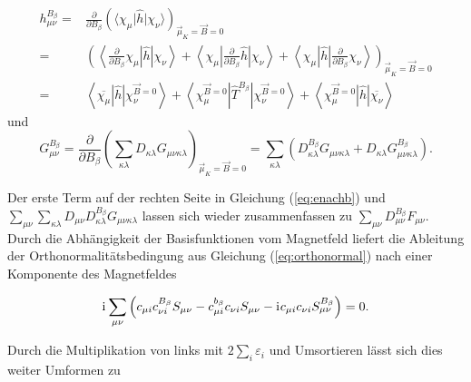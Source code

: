   	     \begin{equation}
     \begin{aligned}
       h_{\mu\nu}^{B_\beta}=&\frac{\partial}{\partial B_\beta}\left(\langle\chi_\mu\vert\hat{h}\vert\chi_\nu\rangle\right)_{\vec{\mu}_K=\vec{B}=0}\\
       =&\left(\left\langle\frac{\partial}{\partial B_\beta}\chi_\mu\left\vert\hat{h}\right\vert\chi_\nu\right\rangle
        +\left\langle\chi_\mu\left\vert\frac{\partial}{\partial B_\beta}\hat{h}\right\vert\chi_\nu\right\rangle
        +\left\langle\chi_\mu\left\vert\hat{h}\right\vert\frac{\partial}{\partial B_\beta}\chi_\nu\right\rangle\right)_{\vec{\mu}_K=\vec{B}=0}\\
       =&\left\langle\overline{\chi_\mu}\left\vert\hat{h}\right\vert\chi_\nu^{\vec{B}=0}\right\rangle
        +\left\langle\chi_\mu^{\vec{B}=0}\left\vert\hat{T}^{B_\beta}\right\vert\chi_\nu^{\vec{B}=0}\right\rangle
        +\left\langle\chi_\mu^{\vec{B}=0}\left\vert\hat{h}\right\vert\overline{\chi_\nu}\right\rangle
     \end{aligned}
     \end{equation}
     und 
     \begin{equation}
      G_{\mu\nu}^{B_\beta}= \frac{\partial}{\partial B_\beta} \left(\sum_{\kappa\lambda}D_{\kappa\lambda}G_{\mu\nu\kappa\lambda}\right)_{\vec{\mu}_K=\vec{B}=0}=\sum_{\kappa\lambda}\left(D_{\kappa\lambda}^{B_\beta}G_{\mu\nu\kappa\lambda}+D_{\kappa\lambda}G_{\mu\nu\kappa\lambda}^{B_\beta}\right).
     \end{equation}
     
     Der erste Term auf der rechten Seite in Gleichung (\ref{eq:enachb}) und $\sum_{\mu\nu}\sum_{\kappa\lambda}D_{\mu\nu}D_{\kappa\lambda}^{B_\beta}G_{\mu\nu\kappa\lambda}$      lassen sich wieder zusammenfassen zu $\sum_{\mu\nu}D_{\mu\nu}^{B_\beta}F_{\mu\nu}$. Durch die Abhängigkeit der Basisfunktionen vom Magnetfeld liefert die Ableitung der Orthonormalitätsbedingung aus Gleichung (\ref{eq:orthonormal}) nach einer Komponente des Magnetfeldes
     
     \begin{equation}\label{eq:orthonormalnachb}
     \mathrm{i}\mkern1mu\sum_{\mu\nu}\left(c_{\mu i}c_{\nu i}^{B_\beta}S_{\mu\nu}-c_{\mu i}^{b_\beta}c_{\nu i}S_{\mu\nu}-\mathrm{i}\mkern1mu c_{\mu i}c_{\nu i}S_{\mu\nu}^{B_\beta}\right)=0.
     \end{equation}
     
     Durch die Multiplikation von links mit $2\sum_i\varepsilon_i$ und Umsortieren lässt sich dies weiter Umformen zu
     
